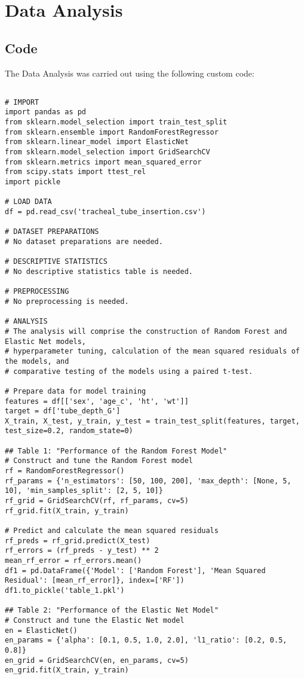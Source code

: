 \documentclass[11pt]{article}
\begin{document}
\section{Data Analysis}
\subsection{{Code}}
The Data Analysis was carried out using the following custom code:

\begin{verbatim}

# IMPORT
import pandas as pd
from sklearn.model_selection import train_test_split
from sklearn.ensemble import RandomForestRegressor
from sklearn.linear_model import ElasticNet
from sklearn.model_selection import GridSearchCV
from sklearn.metrics import mean_squared_error
from scipy.stats import ttest_rel
import pickle

# LOAD DATA
df = pd.read_csv('tracheal_tube_insertion.csv')

# DATASET PREPARATIONS
# No dataset preparations are needed.

# DESCRIPTIVE STATISTICS
# No descriptive statistics table is needed.

# PREPROCESSING
# No preprocessing is needed.

# ANALYSIS
# The analysis will comprise the construction of Random Forest and Elastic Net models,
# hyperparameter tuning, calculation of the mean squared residuals of the models, and 
# comparative testing of the models using a paired t-test.

# Prepare data for model training
features = df[['sex', 'age_c', 'ht', 'wt']]
target = df['tube_depth_G']
X_train, X_test, y_train, y_test = train_test_split(features, target, test_size=0.2, random_state=0)

## Table 1: "Performance of the Random Forest Model"
# Construct and tune the Random Forest model
rf = RandomForestRegressor()
rf_params = {'n_estimators': [50, 100, 200], 'max_depth': [None, 5, 10], 'min_samples_split': [2, 5, 10]}
rf_grid = GridSearchCV(rf, rf_params, cv=5)
rf_grid.fit(X_train, y_train)

# Predict and calculate the mean squared residuals
rf_preds = rf_grid.predict(X_test)
rf_errors = (rf_preds - y_test) ** 2
mean_rf_error = rf_errors.mean()
df1 = pd.DataFrame({'Model': ['Random Forest'], 'Mean Squared Residual': [mean_rf_error]}, index=['RF'])
df1.to_pickle('table_1.pkl')

## Table 2: "Performance of the Elastic Net Model"
# Construct and tune the Elastic Net model
en = ElasticNet()
en_params = {'alpha': [0.1, 0.5, 1.0, 2.0], 'l1_ratio': [0.2, 0.5, 0.8]}
en_grid = GridSearchCV(en, en_params, cv=5)
en_grid.fit(X_train, y_train)


\end{verbatim}
\end{document}

